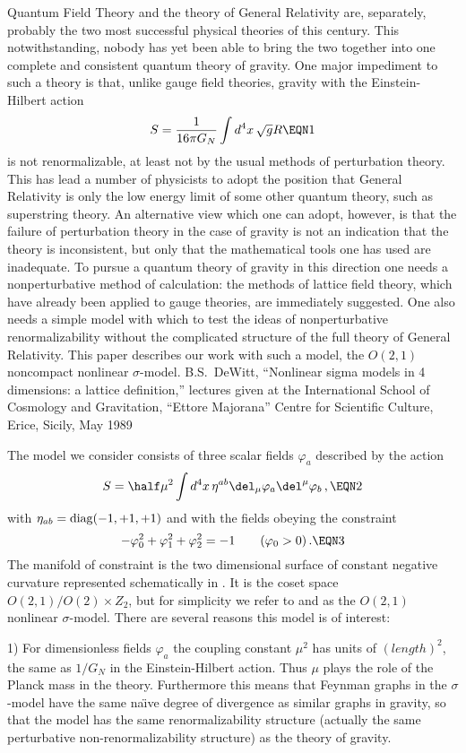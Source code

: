 
Quantum Field Theory and the theory of General Relativity are,
separately, probably the two most successful physical theories of this
century.  This notwithstanding, nobody has yet been able to bring the
two together into one complete and consistent quantum theory of gravity.
One major impediment to such a theory is that, unlike gauge field
theories, gravity with the Einstein-Hilbert action
$$
S = {1 \over 16\pi G_N} \int d^4x\,  \sqrt{g} R
\EQN 1$$
is not renormalizable, at least not by the usual methods of perturbation
theory. This has lead a number of physicists to adopt the position that
General Relativity is only the low energy limit of some other quantum
theory, such as superstring theory.  An alternative view which one
can adopt, however, is that the failure of perturbation theory in the
case of gravity is not an indication that the theory is inconsistent,
but only that the mathematical tools one has used are inadequate.  To
pursue a quantum theory of gravity in this direction one needs a
nonperturbative method of calculation: the methods of lattice field
theory, which have already been applied to gauge theories, are
immediately suggested.  One also needs a simple model with which to test
the ideas of nonperturbative renormalizability without the complicated
structure of the full theory of General Relativity.  This paper
describes our work with such a model, the $O(2,1)$ noncompact nonlinear
$\sigma$-model.
B.S.~DeWitt, ``Nonlinear sigma models in 4 dimensions: a lattice definition,''
lectures given at the International School of Cosmology and Gravitation,
``Ettore Majorana'' Centre for Scientific Culture, Erice, Sicily, May 1989
\endreference\relax

The model we consider consists of three scalar fields $\varphi_a$
described by the action
$$
S = \half \mu^2 \int d^4 x \, \eta^{ab}
     \del_\mu \varphi_a \del^\mu \varphi_b  \,,
\EQN 2$$
with $\eta_{ab}={\rm diag}(-1,+1,+1)$ and with the fields obeying
the constraint
$$
-\varphi_0^2 +  \varphi_1^2 +  \varphi_2^2 = -1
        \qquad (\varphi_0 > 0)          \,.
\EQN 3$$
The manifold of constraint is the two dimensional surface of constant
negative curvature represented schematically 
in .  It is the coset space
$O(2,1)/O(2)\times Z_2$, but for simplicity we refer to  and
 as the $O(2,1)$ nonlinear $\sigma$-model.  There are several
reasons this model is of interest:

\item{1)}
For dimensionless fields $\varphi_a$ the coupling constant $\mu^2$ has
units of $(length)^2$, the same as $1/G_N$ in the Einstein-Hilbert
action.  Thus $\mu$ plays the role of the Planck mass in the theory.
Furthermore this means that Feynman graphs in the $\sigma$-model have
the same na\"{\i}ve degree of divergence as similar graphs in gravity,
so that the model has the same renormalizability structure (actually the
same perturbative non-renormalizability structure) as the theory of
gravity. 

